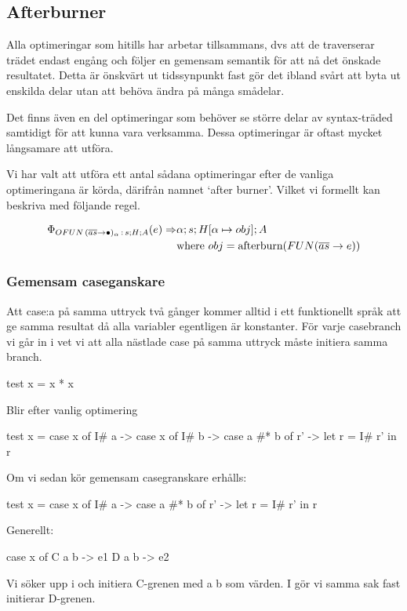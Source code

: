 \documentclass[../Optimise]{subfiles}
\begin{document}
\subsection{Afterburner}

Alla optimeringar som hitills har arbetar tillsammans, dvs att de traverserar trädet endast engång och följer en gemensam semantik för att nå det önskade resultatet. Detta är önskvärt ut tidssynpunkt fast gör det ibland svårt att byta ut enskilda delar utan att behöva ändra på många smådelar.

Det finns även en del optimeringar som behöver se större delar av syntax-träded
samtidigt för att kunna vara verksamma. Dessa optimeringar är oftast mycket långsamare att utföra.

Vi har valt att utföra ett antal sådana optimeringar efter de vanliga
optimeringana är körda, därifrån namnet `after burner'. Vilket vi formellt kan beskriva
med följande regel.

\begin{align*}
\Phi_{OFUN\,(\overline{as}\to\bullet)_{\alpha}\,:\,s;H;A}(e) \Rightarrow & \alpha;s;H[\alpha\mapsto obj];A \\
 & \text{where } obj = \text{afterburn} (FUN(\overline{as}\to e))
\end{align*}

\subsubsection{Gemensam caseganskare}

Att case:a på samma uttryck två gånger kommer alltid i ett funktionellt språk att ge
samma resultat då alla variabler egentligen är konstanter. För varje casebranch
vi går in i vet vi att alla nästlade case på samma uttryck måste initiera samma
branch.

\begin{codeEx}
test x = x * x
\end{codeEx}

Blir efter vanlig optimering

\begin{codeEx}
test x = case x of
            I# a -> case x of
                I# b -> case a #* b of
                    r' -> let r = I# r'
                            in r
\end{codeEx}

Om vi sedan kör gemensam casegranskare erhålls:
\begin{codeEx}
test x = case x of
            I# a -> case a #* b of
                r' -> let r = I# r'
                    in r
\end{codeEx}

Generellt:
		\begin{codeEx}
case x of
    C a b -> e1
    D a b -> e2
\end{codeEx}

Vi söker upp  i  och initiera 
C-grenen med a b som värden. I  gör vi samma sak fast initierar D-grenen.
\end{document}
